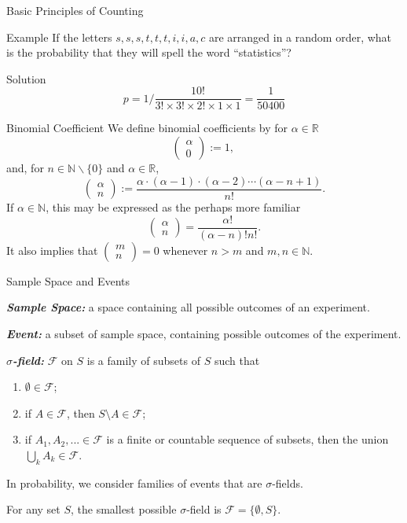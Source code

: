 \documentclass{beamer}
\newcommand{\bb}[1]{\textcolor{antiquefuchsia}{\textbf{\textit{#1}}}}
\begin{document}
\begin{frame}{Basic Principles of Counting}
\begin{block}{Example}
If the letters $s, s, s, t, t, t, i, i, a, c$ are arranged in a random
order, what is the probability that they will spell the word “statistics”?
\end{block}
\pause
\begin{block}{Solution}
$$p=1 / \frac{10 !}{3 ! \times 3 ! \times 2 ! \times 1 \times 1}=\frac{1}{50400}$$
\end{block}
\end{frame}


\begin{frame}{Binomial Coefficient}
We define binomial coefficients by
for $\alpha \in \mathbb{R}$
$$
\left(\begin{array}{l}
\alpha \\
0
\end{array}\right):=1 \text {, }
$$
and, for $n \in \mathbb{N} \backslash\{0\}$ and $\alpha \in \mathbb{R}$,
$$
\left(\begin{array}{l}
\alpha \\
n
\end{array}\right):=\frac{\alpha \cdot(\alpha-1) \cdot(\alpha-2) \cdots(\alpha-n+1)}{n !} .
$$
If $\alpha \in \mathbb{N}$, this may be expressed as the perhaps more familiar
$$
\left(\begin{array}{l}
\alpha \\
n
\end{array}\right)=\frac{\alpha !}{(\alpha-n) ! n !} .
$$
It also implies that
$
\left(\begin{array}{l}
m \\
n
\end{array}\right)=0
$
whenever $n>m$ and $m, n \in \mathbb{N}$.
\end{frame}

\begin{frame}{Sample Space and Events}
\begin{Definition}
\bb{Sample Space:} a space containing all possible outcomes of an experiment.

\bb{Event:} a subset of sample space, containing possible outcomes of the experiment.

\bb{$\sigma$-field:} $\mathscr{F}$ on $S$ is a family of subsets of $S$ such that
\begin{enumerate}
\item $\emptyset\in\mathscr{F}$;
\item if $A\in\mathscr{F}$, then $S\setminus A\in\mathscr{F}$;
\item if $A_1,A_2,...\in\mathscr{F}$ is a finite or countable sequence of subsets, then the union $\bigcup_kA_k\in\mathscr{F}$.
\end{enumerate}
\end{Definition}
In probability, we consider families of events that are $\sigma$-fields.

For any set $S$, the smallest possible $\sigma$-field is $\mathscr{F}=\{\emptyset, S\}$.
\end{frame}
\end{document}
